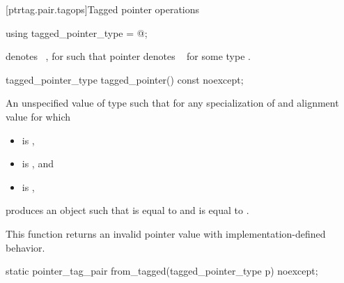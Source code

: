 [ptrtag.pair.tagops]{Tagged pointer operations}

%
\begin{itemdecl}
using tagged_pointer_type = @\seebelow@;
\end{itemdecl}

\begin{itemdescr}
\pnum
{} denotes \cv{}~,
for \cv{} such that pointer denotes \cv{}~ for some type .
\end{itemdescr}

%
\begin{itemdecl}
tagged_pointer_type tagged_pointer() const noexcept;
\end{itemdecl}

\begin{itemdescr}
\pnum
\returns
An unspecified value  of  type
such that for any specialization  of  and
alignment value  for which
\begin{itemize}
\item {} is ,
\item {} is , and
\item {} is ,
\end{itemize}
 produces an object  such that
 is equal to  and
 is equal to .
\begin{note}
This function returns an invalid pointer value
with implementation-defined behavior.
\end{note}
\end{itemdescr}

%
\begin{itemdecl}
static pointer_tag_pair from_tagged(tagged_pointer_type p) noexcept;
\end{itemdecl}

